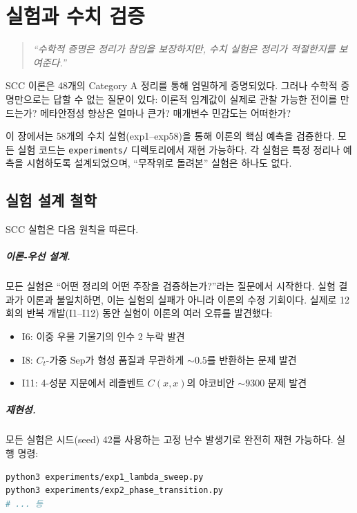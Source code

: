 
\chapter{실험과 수치 검증}
\label{ch:experiments}

\begin{quote}
\textit{``수학적 증명은 정리가 참임을 보장하지만, 수치 실험은 정리가 \emph{적절한지}를 보여준다.''}
\end{quote}

\noindent
SCC 이론은 48개의 Category A 정리를 통해 엄밀하게 증명되었다. 그러나 수학적 증명만으로는 답할 수 없는 질문이 있다: 이론적 임계값이 실제로 관찰 가능한 전이를 만드는가? 메타안정성 향상은 얼마나 큰가? 매개변수 민감도는 어떠한가?

이 장에서는 58개의 수치 실험(exp1--exp58)을 통해 이론의 핵심 예측을 검증한다. 모든 실험 코드는 \texttt{experiments/} 디렉토리에서 재현 가능하다. 각 실험은 특정 정리나 예측을 시험하도록 설계되었으며, ``무작위로 돌려본'' 실험은 하나도 없다.


\section{실험 설계 철학}
\label{sec:exp-philosophy}

SCC 실험은 다음 원칙을 따른다.

\paragraph{이론-우선 설계.}
모든 실험은 ``어떤 정리의 어떤 주장을 검증하는가?''라는 질문에서 시작한다. 실험 결과가 이론과 불일치하면, 이는 실험의 실패가 아니라 이론의 수정 기회이다. 실제로 12회의 반복 개발(I1--I12) 동안 실험이 이론의 여러 오류를 발견했다:
\begin{itemize}
    \item I6: 이중 우물 기울기의 인수 2 누락 발견
    \item I8: $C_t$-가중 Sep가 형성 품질과 무관하게 $\sim 0.5$를 반환하는 문제 발견
    \item I11: 4-성분 지문에서 레졸벤트 $C(x,x)$의 야코비안 $\sim 9300$ 문제 발견
\end{itemize}

\paragraph{재현성.} 모든 실험은 시드(seed) 42를 사용하는 고정 난수 발생기로 완전히 재현 가능하다. 실행 명령:
\begin{lstlisting}[language=bash]
python3 experiments/exp1_lambda_sweep.py
python3 experiments/exp2_phase_transition.py
# ... 등
\end{lstlisting}


